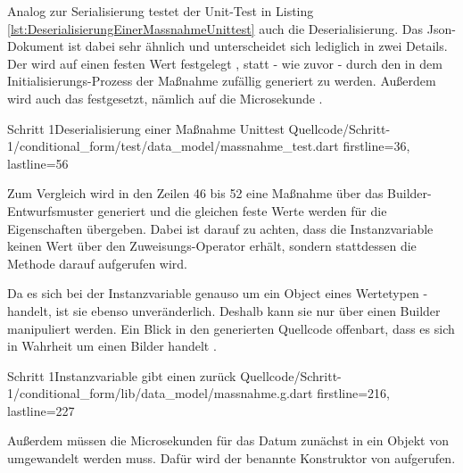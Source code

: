 Analog zur Serialisierung testet der Unit-Test in Listing \ref{lst:DeserialisierungEinerMassnahmeUnittest} auch die Deserialisierung.
Das Json-Dokument ist dabei sehr ähnlich und unterscheidet sich lediglich in zwei Details.
Der  wird auf einen festen Wert festgelegt , statt - wie zuvor - durch den in dem Initialisierungs-Prozess der Maßnahme zufällig generiert zu werden.
Außerdem wird auch das  festgesetzt, nämlich auf die Microsekunde  .

\begin{alexlisting}{Schritt 1}{Deserialisierung einer Maßnahme Unittest}
  {Quellcode/Schritt-1/conditional_form/test/data_model/massnahme_test.dart}
  {firstline=36, lastline=56}
  \label{lst:DeserialisierungEinerMassnahmeUnittest}
\end{alexlisting}


Zum Vergleich wird in den Zeilen 46 bis 52 eine Maßnahme über das Builder-Entwurfsmuster generiert und die gleichen feste Werte werden für die Eigenschaften übergeben.
Dabei ist darauf zu achten, dass die Instanzvariable  keinen Wert über den Zuweisungs-Operator \IC{=} erhält, sondern stattdessen die Methode  darauf aufgerufen wird.

Da es sich bei der Instanzvariable  genauso um ein Object eines Wertetypen - handelt, ist sie ebenso unveränderlich.
Deshalb kann sie nur über einen Builder manipuliert werden.
Ein Blick in den generierten Quellcode offenbart, dass es sich in Wahrheit um einen Bilder handelt .

\begin{alexlisting}{Schritt 1}{Instanzvariable  gibt einen  zurück}
  {Quellcode/Schritt-1/conditional_form/lib/data_model/massnahme.g.dart}
  {firstline=216, lastline=227}
  \label{lst:Schritt1InstanzvariableLetzteBearbeitungGibtEinenLetzteBearbeitungBuilderZurueck}
\end{alexlisting}

Außerdem müssen die Microsekunden für das Datum zunächst in ein Objekt von  umgewandelt werden muss.
Dafür wird der benannte Konstruktor  von   aufgerufen.

